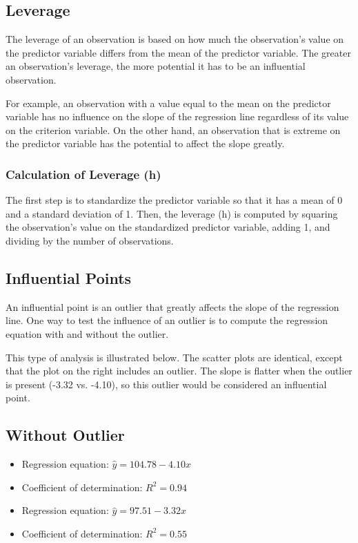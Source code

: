 \documentclass[residuals.tex]{subfiles}
\begin{document}
\subsection{Leverage}
The leverage of an observation is based on how much the observation's value on the predictor variable differs from the mean of the predictor variable. The greater an observation's leverage, the more potential it has to be an influential observation. 

For example, an observation with a value equal to the mean on the predictor variable has no influence on the slope of the regression line regardless of its value on the criterion variable. On the other hand, an observation that is extreme on the predictor variable has the potential to affect the slope greatly.

\subsubsection{Calculation of Leverage (h)}
The first step is to standardize the predictor variable so that it has a mean of 0 and a standard deviation of 1. Then, the leverage (h) is computed by squaring the observation's value on the standardized predictor variable, adding 1, and dividing by the number of observations.


\subsection{Influential Points}

An influential point is an outlier that greatly affects the slope of the regression line. One way to test the influence of an outlier is to compute the regression equation with and without the outlier.

This type of analysis is illustrated below. The scatter plots are identical, except that the plot on the right includes an outlier. The slope is flatter when the outlier is present (-3.32 vs. -4.10), so this outlier would be considered an influential point.

\subsection{Without Outlier}


\begin{itemize}
\item Regression equation: $\hat{y} = 104.78 - 4.10x$
\item Coefficient of determination: $R^2 = 0.94$ 
\end{itemize}
\begin{itemize}
\item Regression equation: $\hat{y} = 97.51 - 3.32x$
\item Coefficient of determination: $R^2 = 0.55$ 
\end{itemize}
\end{document}
